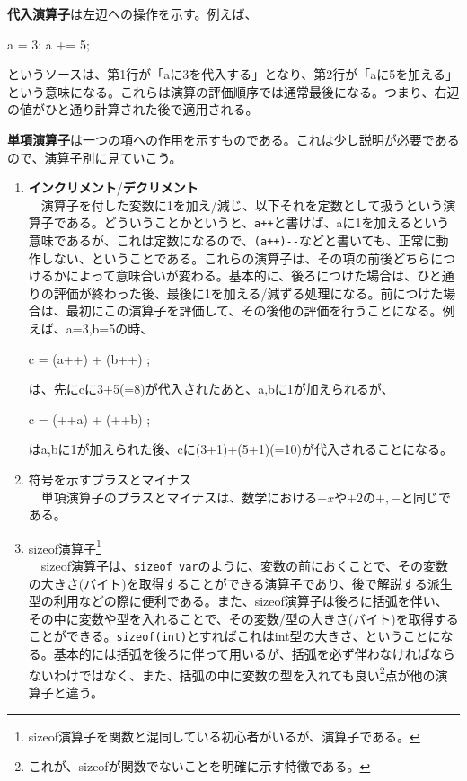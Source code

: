\textbf{代入演算子}は左辺への操作を示す。例えば、
\begin{code}
a = 3;
a += 5;
\end{code}
というソースは、第1行が「aに3を代入する」となり、第2行が「aに5を加える」という意味になる。これらは演算の評価順序では通常最後になる。つまり、右辺の値がひと通り計算された後で適用される。

\textbf{単項演算子}は一つの項への作用を示すものである。これは少し説明が必要であるので、演算子別に見ていこう。
\begin{enumerate}
\item \textbf{インクリメント}/\textbf{デクリメント}\\
　演算子を付した変数に1を加え/減じ、以下それを定数として扱うという演算子である。どういうことかというと、\verb|a++|と書けば、aに1を加えるという意味であるが、これは定数になるので、\verb|(a++)--|などと書いても、正常に動作しない、ということである。これらの演算子は、その項の前後どちらにつけるかによって意味合いが変わる。基本的に、後ろにつけた場合は、ひと通りの評価が終わった後、最後に1を加える/減ずる処理になる。前につけた場合は、最初にこの演算子を評価して、その後他の評価を行うことになる。例えば、a=3,b=5の時、
\begin{code}
c = (a++) + (b++) ;
\end{code}
は、先にcに3+5(=8)が代入されたあと、a,bに1が加えられるが、
\begin{code}
c = (++a) + (++b) ;
\end{code}
はa,bに1が加えられた後、cに(3+1)+(5+1)(=10)が代入されることになる。

\item 符号を示すプラスとマイナス\\
　単項演算子のプラスとマイナスは、数学における$-x$や$+2$の$+,-$と同じである。

\item sizeof演算子\footnote{sizeof演算子を関数と混同している初心者がいるが、演算子である。}\\
　sizeof演算子は、\verb|sizeof var|のように、変数の前におくことで、その変数の大きさ(バイト)を取得することができる演算子であり、後で解説する派生型の利用などの際に便利である。また、sizeof演算子は後ろに括弧を伴い、その中に変数や型を入れることで、その変数/型の大きさ(バイト)を取得することができる。\verb|sizeof(int)|とすればこれはint型の大きさ、ということになる。基本的には括弧を後ろに伴って用いるが、括弧を必ず伴わなければならないわけではなく、また、括弧の中に変数の型を入れても良い\footnote{これが、sizeofが関数でないことを明確に示す特徴である。}点が他の演算子と違う。
\end{enumerate}

